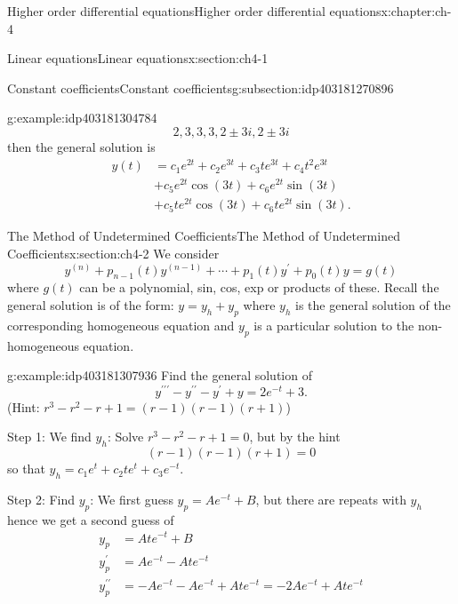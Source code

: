 \documentclass[oneside,10pt,]{book}
\numberwithin{equation}{section}
\numberwithin{equation}{section}
\newcommand{\amp}{&}
\begin{document}
\begin{chapterptx}{Higher order differential equations}{}{Higher order differential equations}{}{}{x:chapter:ch-4}
\begin{sectionptx}{Linear equations}{}{Linear equations}{}{}{x:section:ch4-1}
\begin{subsectionptx}{Constant coefficients}{}{Constant coefficients}{}{}{g:subsection:idp403181270896}
\begin{example}{}{g:example:idp403181304784}
\begin{equation*}
2,3,3,3,2\pm3i,2\pm3i
\end{equation*}
then the general solution is%
\begin{align*}
y(t) \amp =c_{1}e^{2t}+c_{2}e^{3t}+c_{3}te^{3t}+c_{4}t^{2}e^{3t}\\
\amp +c_{5}e^{2t}\cos(3t)+c_{6}e^{2t}\sin(3t)\\
\amp +c_{5}te^{2t}\cos(3t)+c_{6}te^{2t}\sin(3t).
\end{align*}
%
\end{example}
\end{subsectionptx}
\end{sectionptx}
%
%
\typeout{************************************************}
\typeout{************************************************}
%
\begin{sectionptx}{The Method of Undetermined Coefficients}{}{The Method of Undetermined Coefficients}{}{}{x:section:ch4-2}
We consider%
\begin{equation*}
y^{(n)}+p_{n-1}(t)y^{(n-1)}+\cdots+p_{1}(t)y^{\prime}+p_{0}(t)y=g(t)
\end{equation*}
where \(g(t)\) can be a polynomial, sin, cos, exp or products of these. Recall the general solution is of the form: \(y=y_{h}+y_{p}\) where \(y_{h}\) is the general solution of the corresponding homogeneous equation and \(y_{p}\) is a particular solution to the non-homogeneous equation.%
\begin{example}{}{g:example:idp403181307936}%
Find the general solution of%
\begin{equation*}
y^{\prime\prime\prime}-y^{\prime\prime}-y^{\prime}+y=2e^{-t}+3.
\end{equation*}
(Hint: \(r^{3}-r^{2}-r+1=\left(r-1\right)\left(r-1\right)\left(r+1\right)\))%
\par
Step 1: We find \(y_{h}\): Solve \(r^{3}-r^{2}-r+1=0\), but by the hint%
\begin{equation*}
\left(r-1\right)\left(r-1\right)\left(r+1\right)=0
\end{equation*}
so that \(y_{h}=c_{1}e^{t}+c_{2}te^{t}+c_{3}e^{-t}\).%
\par
Step 2: Find \(y_{p}\): We first guess \(y_{p}=Ae^{-t}+B\), but there are repeats with \(y_{h}\) hence we get a second guess of%
\begin{align*}
y_{p} \amp =Ate^{-t}+B\\
y_{p}^{\prime} \amp =Ae^{-t}-Ate^{-t}\\
y_{p}^{\prime\prime} \amp =-Ae^{-t}-Ae^{-t}+Ate^{-t}=-2Ae^{-t}+Ate^{-t}\\

\end{align*}
\end{example}
\end{sectionptx}
\end{chapterptx}
\end{document}
